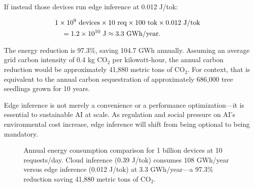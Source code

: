 \documentclass[12pt, letterpaper, twoside]{report}
\begin{document}
If instead those devices run edge inference at 0.012 J/tok:

\begin{align}
&1 \times 10^9 \text{ devices} \times 10 \text{ req} \times 100 \text{ tok} \times 0.012 \text{ J/tok} \notag\\
&\quad = 1.2 \times 10^{10} \text{ J} \approx 3.3 \text{ GWh/year}. \notag
\end{align}

The energy reduction is 97.3\%, saving 104.7 GWh annually. Assuming an average grid carbon intensity of 0.4 kg CO$_2$ per kilowatt-hour, the annual carbon reduction would be approximately 41,880 metric tons of CO$_2$. For context, that is equivalent to the annual carbon sequestration of approximately 686,000 tree seedlings grown for 10 years.

Edge inference is not merely a convenience or a performance optimization---it is essential to sustainable AI at scale. As regulation and social pressure on AI's environmental cost increase, edge inference will shift from being optional to being mandatory.

\begin{figure}[H]
\centering
{}
\caption{Annual energy consumption comparison for 1 billion devices at 10 requests/day. Cloud inference (0.39 J/tok) consumes 108 GWh/year versus edge inference (0.012 J/tok) at 3.3 GWh/year---a 97.3\% reduction saving 41,880 metric tons of CO$_2$.}
\label{fig:energy_comparison}
\end{figure}
\end{document}
